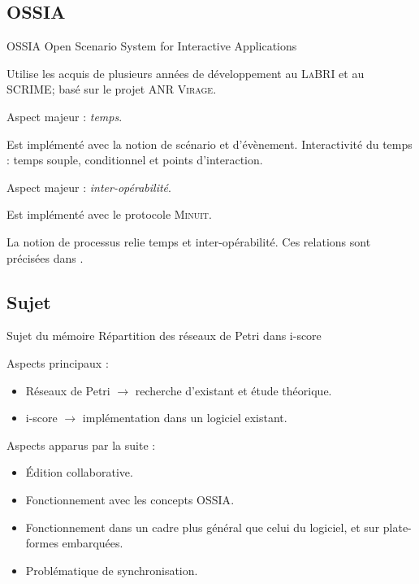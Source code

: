 \subsection{OSSIA}
\begin{frame}{OSSIA}
	{\large Open Scenario System for Interactive Applications}
	
	Utilise les acquis de plusieurs années de développement au \textsc{LaBRI} et au \textsc{SCRIME}; basé sur le projet \textsc{ANR Virage}.
	
	\vspace{1em}
	Aspect majeur : \emph{temps}.
	\begin{itemize}
		\itemar Est implémenté avec la notion de scénario et d'évènement.
		\itemar Interactivité du temps : temps souple, conditionnel et points d'interaction.
	\end{itemize}
	
	Aspect majeur : \emph{inter-opérabilité}.
	\begin{itemize}
		\itemar Est implémenté avec le protocole \textsc{Minuit}.
	\end{itemize}
	
	La notion de processus relie temps et inter-opérabilité. Ces relations sont précisées dans \cite{hogue2014ossia}.
\end{frame}


\subsection{Sujet}
\begin{frame}{Sujet du mémoire}
	{\large Répartition des réseaux de Petri dans i-score}
	
	Aspects principaux : 
	\begin{itemize}
		\item Réseaux de Petri $\rightarrow$ recherche d'existant et étude théorique.
		\item i-score $\rightarrow$ implémentation dans un logiciel existant.
	\end{itemize} 
	\vspace{1em}
	Aspects apparus par la suite : 
	\begin{itemize}
		\item Édition collaborative.
		\item Fonctionnement avec les concepts {OSSIA}.
		\item Fonctionnement dans un cadre plus général que celui du logiciel, et sur plate-formes embarquées.
		\item Problématique de synchronisation.
	\end{itemize}
	
\end{frame}



